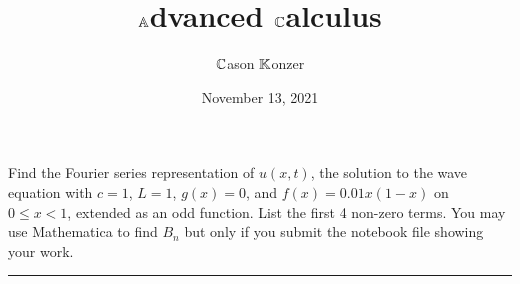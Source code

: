 \documentclass[10pt]{article}
\title{$\mathbb{A}$dvanced $\mathbb{C}$alculus}
\author{$\mathbb{C}$ason $\mathbb{K}$onzer}
\date{November 13, 2021}
\begin{document}
\maketitle

\newpage

\section{\underline{}}
\label{sec: Problem 1}

\noindent
Find the Fourier series representation of $ u(x,t) $, the solution to the wave equation with 
$ c = 1 $, $ L = 1 $, $ g(x) = 0 $, and $ f(x) = 0.01x(1 - x) $ on $ 0 \le x < 1 $, extended as an odd function. 
List the first 4 non-zero terms. You may use Mathematica to find $ B_n $ but only if you submit the notebook file showing your work. \\
\vspace{2.5mm}

\hrule 

\vspace{7.5mm}
\end{document}
